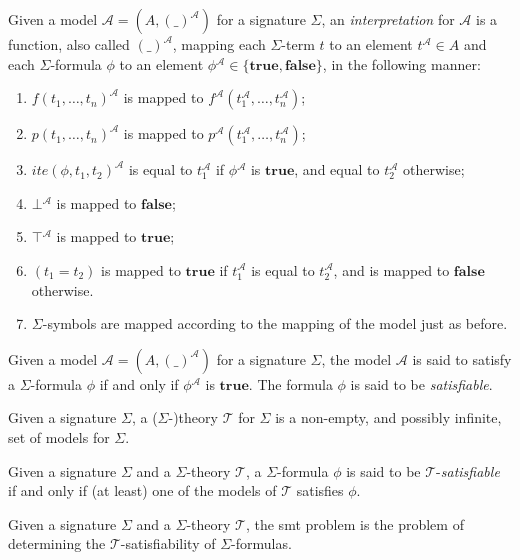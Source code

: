 \begin{definition}[Interpretation]
  Given a model $\mathcal{A} = (A, (\_)^{\mathcal{A}})$ for a signature
  $\Sigma{}$, an \textit{interpretation} for $\mathcal{A}$ is a function, also
  called $(\_)^{\mathcal{A}}$, mapping each $\Sigma{}$-term $t$ to an element
  $t^{\mathcal{A}}\in A$ and each $\Sigma{}$-formula $\phi{}$ to an element
  $\phi{}^{\mathcal{A}}\in \{\mathbf{true}, \mathbf{false}\}$, in the following
  manner:
  \begin{enumerate}
  \item $f(t_1,\ldots,t_n)^{\mathcal{A}}$ is mapped to
    $f^{\mathcal{A}}(t_1^{\mathcal{A}},\ldots,t_n^{\mathcal{A}})$;
  \item $p(t_1,\ldots,t_n)^{\mathcal{A}}$ is mapped to
    $p^{\mathcal{A}}(t_1^{\mathcal{A}},\ldots,t_n^{\mathcal{A}})$;
  \item $ite(\phi{}, t_1, t_2)^{\mathcal{A}}$ is equal to $t_1^{\mathcal{A}}$ if
    $\phi{}^{\mathcal{A}}$ is $\mathbf{true}$, and equal to $t_2^{\mathcal{A}}$
    otherwise;
  \item $\bot{}^{\mathcal{A}}$ is mapped to $\mathbf{false}$;
  \item $\top{}^{\mathcal{A}}$ is mapped to $\mathbf{true}$;
  \item $(t_1 = t_2)$ is mapped to $\mathbf{true}$ if
    $t_1^{\mathcal{A}}$ is equal to $ t_2^{\mathcal{A}}$, and is mapped to
    $\mathbf{false}$ otherwise.
  \item $\Sigma$-symbols are mapped according to the mapping of the model just
    as before.
  \end{enumerate}
\end{definition}

\begin{definition}[Satisfiability]
  Given a model $\mathcal{A} = (A, (\_)^{\mathcal{A}})$ for a signature
  $\Sigma{}$, the model $\mathcal{A}$ is said to satisfy a $\Sigma{}$-formula
  $\phi{}$ if and only if $\phi{}^{\mathcal{A}}$ is $\mathbf{true}$.
  The formula $\phi{}$ is said to be \textit{satisfiable}.
\end{definition}

\begin{definition}[Theory]\label{def:theory}
  Given a signature $\Sigma{}$, a ($\Sigma{}$-)theory $\mathcal{T}$ for
  $\Sigma{}$ is a non-empty, and possibly infinite, set of models for $\Sigma{}$.
\end{definition}

\begin{definition}
  Given a signature $\Sigma{}$ and a $\Sigma{}$-theory $\mathcal{T}$, a
  $\Sigma{}$-formula $\phi{}$ is said to be $\mathcal{T}$-\textit{satisfiable}
  if and only if (at least) one of the models of $\mathcal{T}$ satisfies
  $\phi{}$.
\end{definition}

\begin{definition}
  Given a signature $\Sigma{}$ and a $\Sigma{}$-theory $\mathcal{T}$, the
  \gls{smt} problem is the problem of determining the
  $\mathcal{T}$-satisfiability of $\Sigma{}$-formulas.
\end{definition}

